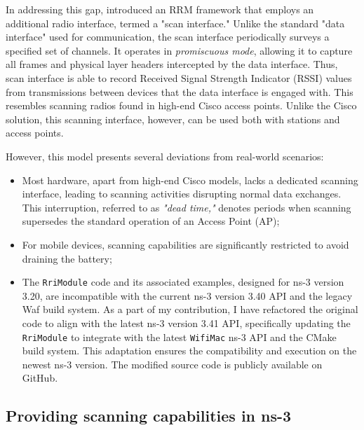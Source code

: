 In addressing this gap, \cite{bharadwajSimulationFrameworkRadio2017} introduced an RRM framework that employs an additional radio interface, termed a "scan interface." Unlike the standard "data interface" used for communication, the scan interface periodically surveys a specified set of channels. It operates in \textit{promiscuous mode}, allowing it to capture all frames and physical layer headers intercepted by the data interface. Thus, scan interface is able to record Received Signal Strength Indicator (RSSI) values from transmissions between devices that the data interface is engaged with. This resembles scanning radios found in high-end Cisco access points. Unlike the Cisco solution, this scanning interface, however, can be used both with stations and access points.

However, this model presents several deviations from real-world scenarios:
\begin{itemize}
    \item Most hardware, apart from high-end Cisco models, lacks a dedicated scanning interface, leading to scanning activities disrupting normal data exchanges. This interruption, referred to as \textit{"dead time,"} denotes periods when scanning supersedes the standard operation of an Access Point (AP);
    \item For mobile devices, scanning capabilities are significantly restricted to avoid draining the battery;
    \item The \texttt{RriModule} code and its associated examples, designed for ns-3 version 3.20, are incompatible with the current ns-3 version 3.40 API and the legacy Waf build system. As a part of my contribution, I have refactored the original code to align with the latest ns-3 version 3.41 API, specifically updating the \texttt{RriModule} to integrate with the latest \texttt{WifiMac} ns-3 API and the CMake build system. This adaptation ensures the compatibility and execution on the newest ns-3 version. The modified source code is publicly available on GitHub.
\end{itemize}

\subsection{Providing scanning capabilities in ns-3}
\label{chap:impl:sec:simulation_method:subsec:scanning}

